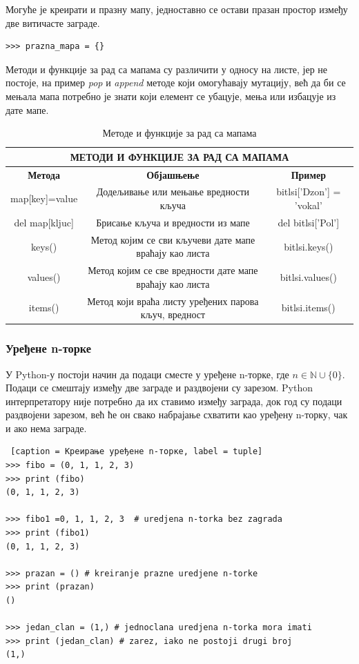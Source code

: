 Могуће је креирати и празну мапу, једноставно се остави празан простор између две витичасте заграде.

\begin{lstlisting}[caption = Креирање празне мапе, label=prazna_mapa]
>>> prazna_mapa = {}
\end{lstlisting}

Методи и функције за рад са мапама су различити у односу на листе, јер не постоје, на пример \emph{pop} и \emph{append} методе који омогућавају мутацију, већ да би се мењала мапа потребно је знати који елемент се убацује, мења или избацује из дате мапе.

\begin{table}[here]
\centering
\begin{tabular}{|c|c|c|} \hline
\multicolumn{3}{|c|}{\textbf{МЕТОДИ И ФУНКЦИЈЕ ЗА РАД СА МАПАМА}} \\ \hline
\textbf{Метода} & \textbf{Објашњење} & \textbf{Пример} \\ \hline
map[key]=value & Додељивање или мењање вредности кључа & bitlsi['Dzon'] = 'vokal' \\ \hline
del map[kljuc] & Брисање кључа и вредности из мапе & del bitlsi['Pol'] \\ \hline
keys() & Метод којим се сви кључеви дате мапе враћају као листа & bitlsi.keys() \\ \hline
values() & Метод којим се све вредности дате мапе враћају као листа & bitlsi.values() \\ \hline
items() & Метод који враћа листу уређених парова кључ, вредност & bitlsi.items() \\ \hline
\end{tabular}
\caption{Методе и функције за рад са мапама}
\label{tabela:mape}
\end{table}

\subsubsection{Уређене n-торке}

У Python-у постоји начин да подаци сместе у уређене n-торке, где $n \in \mathbb{N}\cup\{0\}$. Подаци се смештају између две заграде и раздвојени су зарезом. Python интерпретатору није потребно да их ставимо између заграда, док год су подаци раздвојени зарезом, већ ће он свако набрајање схватити као уређену n-торку, чак и ако нема заграде.

\begin{lstlisting} [caption = Креирање уређене n-торке, label = tuple]
>>> fibo = (0, 1, 1, 2, 3)
>>> print (fibo)
(0, 1, 1, 2, 3)

>>> fibo1 =0, 1, 1, 2, 3  # uredjena n-torka bez zagrada
>>> print (fibo1)
(0, 1, 1, 2, 3)

>>> prazan = () # kreiranje prazne uredjene n-torke
>>> print (prazan)
()

>>> jedan_clan = (1,) # jednoclana uredjena n-torka mora imati
>>> print (jedan_clan) # zarez, iako ne postoji drugi broj
(1,)
\end{lstlisting}


